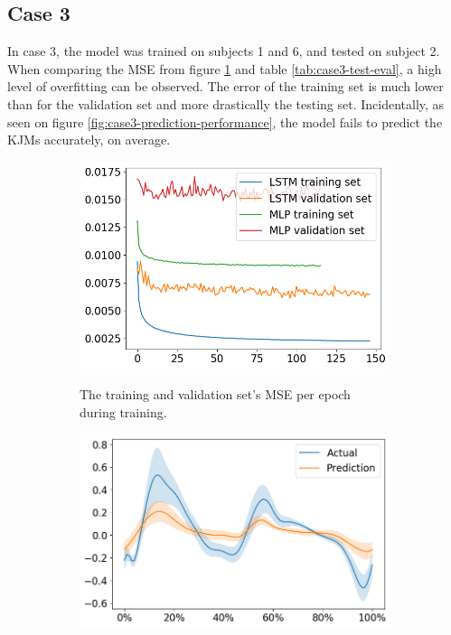 \documentclass[../main.tex]{subfiles}
\begin{document}
\subsection{Case 3}
\label{sec:results-case3}
In case 3, the model was trained on subjects 1 and 6, and tested on subject 2.
When comparing the \ac{MSE} from figure \ref{fig:case3-training-performance} and table \ref{tab:case3-test-eval}, a high level of overfitting can be observed.
The error of the training set is much lower than for the validation set and more drastically the testing set.
Incidentally, as seen on figure \ref{fig:case3-prediction-performance}, the model fails to predict the \acp{KJM} accurately, on average.
\begin{figure}[ht!]
    \captionsetup[subfigure]{aboveskip=-12pt}
     \centering
     \begin{subfigure}[b]{0.475\textwidth}
         \centering
         \includegraphics[width=\textwidth]{img/results/training_history/Case3_LSTMvsMLP_training.png}
         \label{fig:case3-training-performance}
         \caption{The training and validation set's \ac{MSE} per epoch during training.}
     \end{subfigure}
     \hfill
     \begin{subfigure}[b]{0.515\textwidth}
         \centering
         \includegraphics[width=\textwidth]{img/results/test_prediction_evaluation/Case3_LSTM_test_prediction.png}

\end{subfigure}
\end{figure}
\end{document}
